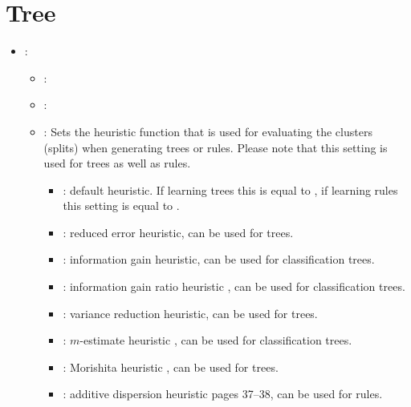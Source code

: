 \section{Tree}


\begin{itemize}
    \item {}:
           \begin{itemize}
                \item \optionPossibleValues{}: 
                \item \optionDefaultValue{}: 
                \item \optionDescrption{}: Sets the heuristic function that is used for evaluating the clusters (splits) when generating trees or rules. Please note that this setting is used for trees as well as rules.
                \begin{itemize}
                    \item {}: default heuristic. If learning trees this is equal to , if learning rules this setting is equal to .
                    \item {}: reduced error heuristic, can be used for trees.
                    \item {}: information gain heuristic, can be used for classification trees.
                    \item {}: information gain ratio heuristic \cite{Quinlan1986}, can be used for classification trees.
                    \item {}: variance reduction heuristic, can be used for trees.
                    \item {}: $m$-estimate heuristic \cite{Cestnik1990}, can be used for classification trees.
                    \item {}: Morishita heuristic \cite{Sese2004}, can be used for trees.%
                    \item {}: additive dispersion heuristic \cite{Zenko07} pages 37--38, can be used for rules.

\end{itemize}
\end{itemize}
\end{itemize}
